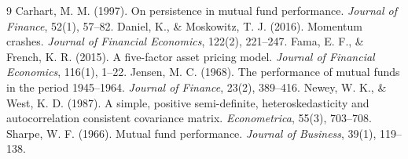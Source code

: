 \documentclass[10pt]{article}
\begin{document}
\begin{thebibliography}{9}\small
{} Carhart, M. M. (1997). On persistence in mutual fund performance. \emph{Journal of Finance}, 52(1), 57--82.
 Daniel, K., \& Moskowitz, T. J. (2016). Momentum crashes. \emph{Journal of Financial Economics}, 122(2), 221--247.
 Fama, E. F., \& French, K. R. (2015). A five-factor asset pricing model. \emph{Journal of Financial Economics}, 116(1), 1--22.
 Jensen, M. C. (1968). The performance of mutual funds in the period 1945--1964. \emph{Journal of Finance}, 23(2), 389--416.
 Newey, W. K., \& West, K. D. (1987). A simple, positive semi-definite, heteroskedasticity and autocorrelation consistent covariance matrix. \emph{Econometrica}, 55(3), 703--708.
 Sharpe, W. F. (1966). Mutual fund performance. \emph{Journal of Business}, 39(1), 119--138.
\end{thebibliography}
\end{document}
